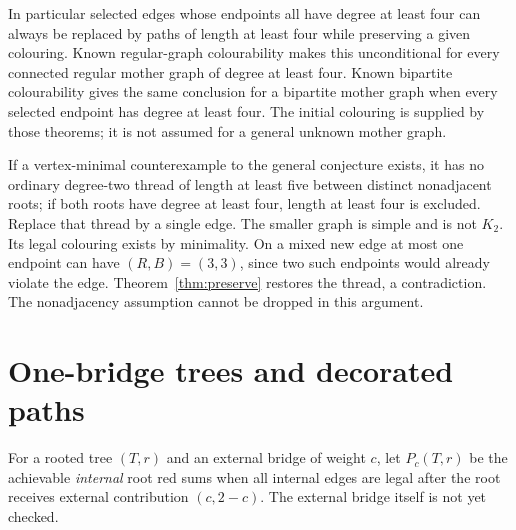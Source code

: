 In particular selected edges whose endpoints all have degree at least
four can always be replaced by paths of length at least four while
preserving a given colouring. Known regular-graph colourability
\cite{GOW26} makes this unconditional for every connected regular
mother graph of degree at least four. Known bipartite colourability
\cite{GW23} gives the same conclusion for a bipartite mother graph
when every selected endpoint has degree at least four. The initial
colouring is supplied by those theorems; it is not assumed for a
general unknown mother graph.

If a vertex-minimal counterexample to the general conjecture exists,
it has no ordinary degree-two thread of length at least five between
distinct nonadjacent roots; if both roots have degree at least four,
length at least four is excluded. Replace that thread by a single edge.
The smaller graph is simple and is not $K_2$. Its legal colouring
exists by minimality. On a mixed new edge at most one endpoint can have
$(R,B)=(3,3)$, since two such endpoints would already violate the edge.
Theorem~\ref{thm:preserve} restores the thread, a contradiction. The
nonadjacency assumption cannot be dropped in this argument.

\section{One-bridge trees and decorated paths}\label{sec:trees}

For a rooted tree $(T,r)$ and an external bridge of weight $c$, let
$P_c(T,r)$ be the achievable \emph{internal} root red sums when all
internal edges are legal after the root receives external contribution
$(c,2-c)$. The external bridge itself is not yet checked.

